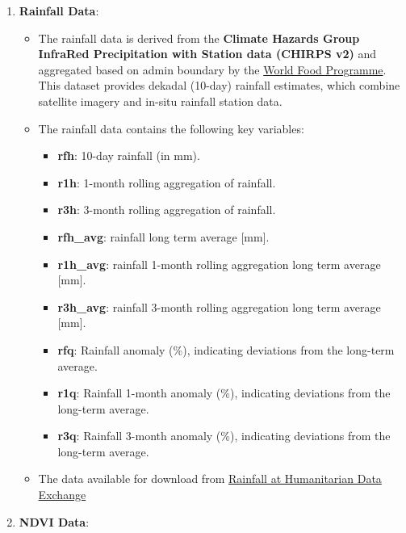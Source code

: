 \documentclass[
]{article}
\providecommand{\tightlist}{%
  \setlength{\itemsep}{0pt}\setlength{\parskip}{0pt}}
\begin{document}
\begin{enumerate}
\def\labelenumi{\arabic{enumi}.}
\tightlist
\item
  \textbf{Rainfall Data}:

  \begin{itemize}
  \tightlist
  \item
    The rainfall data is derived from the \textbf{Climate Hazards Group
    InfraRed Precipitation with Station data (CHIRPS v2)} and aggregated
    based on admin boundary by the
    \href{https://dataviz.vam.wfp.org/climate-explorer/rainfall-and-vegetation?current_page=1}{World
    Food Programme}. This dataset provides dekadal (10-day) rainfall
    estimates, which combine satellite imagery and in-situ rainfall
    station data.
  \item
    The rainfall data contains the following key variables:

    \begin{itemize}
    \tightlist
    \item
      \textbf{rfh}: 10-day rainfall (in mm).
    \item
      \textbf{r1h}: 1-month rolling aggregation of rainfall.
    \item
      \textbf{r3h}: 3-month rolling aggregation of rainfall.
    \item
      \textbf{rfh\_avg}: rainfall long term average {[}mm{]}.
    \item
      \textbf{r1h\_avg}: rainfall 1-month rolling aggregation long term
      average {[}mm{]}.
    \item
      \textbf{r3h\_avg}: rainfall 3-month rolling aggregation long term
      average {[}mm{]}.
    \item
      \textbf{rfq}: Rainfall anomaly (\%), indicating deviations from
      the long-term average.
    \item
      \textbf{r1q}: Rainfall 1-month anomaly (\%), indicating deviations
      from the long-term average.
    \item
      \textbf{r3q}: Rainfall 3-month anomaly (\%), indicating deviations
      from the long-term average.
    \end{itemize}
  \item
    The data available for download from
    \href{https://data.humdata.org/dataset/?dataseries_name=WFP+-+Rainfall+Indicators+at+Subnational+Level}{Rainfall
    at Humanitarian Data Exchange}
  \end{itemize}
\item
  \textbf{NDVI Data}:


\end{enumerate}
\end{document}
